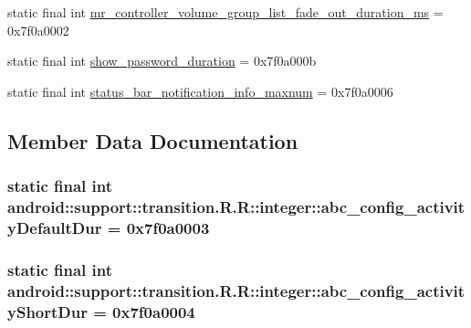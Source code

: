 \begin{CompactItemize}
\item 
static final int \hyperlink{classandroid_1_1support_1_1transition_1_1_r_1_1integer_ab214578823969e302521370b70102dc}{mr\_\-controller\_\-volume\_\-group\_\-list\_\-fade\_\-out\_\-duration\_\-ms} = 0x7f0a0002
\item 
static final int \hyperlink{classandroid_1_1support_1_1transition_1_1_r_1_1integer_6b8cbe5ea75dd19ef32bf137aac63b2f}{show\_\-password\_\-duration} = 0x7f0a000b
\item 
static final int \hyperlink{classandroid_1_1support_1_1transition_1_1_r_1_1integer_4ad3beeb62885f6ece159b16c67d7363}{status\_\-bar\_\-notification\_\-info\_\-maxnum} = 0x7f0a0006
\end{CompactItemize}


\subsection{Member Data Documentation}
\hypertarget{classandroid_1_1support_1_1transition_1_1_r_1_1integer_292e480b26619d0a5b588728323e0215}{
\subsubsection[{abc\_\-config\_\-activityDefaultDur}]{\setlength{\rightskip}{0pt plus 5cm}static final int android::support::transition.R.R::integer::abc\_\-config\_\-activityDefaultDur = 0x7f0a0003}}
\label{classandroid_1_1support_1_1transition_1_1_r_1_1integer_292e480b26619d0a5b588728323e0215}


\hypertarget{classandroid_1_1support_1_1transition_1_1_r_1_1integer_d6c28fc3c3366ef5bcb1814fe31ee88d}{
\subsubsection[{abc\_\-config\_\-activityShortDur}]{\setlength{\rightskip}{0pt plus 5cm}static final int android::support::transition.R.R::integer::abc\_\-config\_\-activityShortDur = 0x7f0a0004}}
\label{classandroid_1_1support_1_1transition_1_1_r_1_1integer_d6c28fc3c3366ef5bcb1814fe31ee88d}


